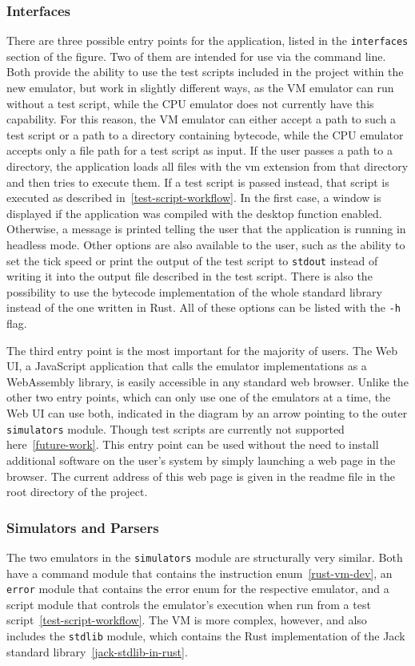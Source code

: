 \subsubsection{Interfaces} \label{interfaces}
There are three possible entry points for the application, listed in the \verb+interfaces+ section of the figure.
Two of them are intended for use via the command line.
Both provide the ability to use the test scripts included in the project within the new emulator, but work in slightly different ways, as the VM emulator can run without a test script, while the CPU emulator does not currently have this capability.
For this reason, the VM emulator can either accept a path to such a test script or a path to a directory containing bytecode, while the CPU emulator accepts only a file path for a test script as input.
If the user passes a path to a directory, the application loads all files with the vm extension from that directory and then tries to execute them.
If a test script is passed instead, that script is executed as described in~\cref{test-script-workflow}.
In the first case, a window is displayed if the application was compiled with the desktop function enabled.
Otherwise, a message is printed telling the user that the application is running in headless mode.
Other options are also available to the user, such as the ability to set the tick speed or print the output of the test script to \verb+stdout+ instead of writing it into the output file described in the test script.
There is also the possibility to use the bytecode implementation of the whole standard library instead of the one written in Rust.
All of these options can be listed with the \verb+-h+ flag.

The third entry point is the most important for the majority of users.
The Web UI, a JavaScript application that calls the emulator implementations as a WebAssembly library, is easily accessible in any standard web browser.
Unlike the other two entry points, which can only use one of the emulators at a time, the Web UI can use both, indicated in the diagram by an arrow pointing to the outer \verb+simulators+ module.
Though test scripts are currently not supported here~\ref{future-work}.
This entry point can be used without the need to install additional software on the user's system by simply launching a web page in the browser.
The current address of this web page is given in the readme file in the root directory of the project.

\subsubsection{Simulators and Parsers}
The two emulators in the \verb+simulators+ module are structurally very similar.
Both have a command module that contains the instruction enum~\ref{rust-vm-dev}, an \verb+error+ module that contains the error enum for the respective emulator, and a script module that controls the emulator's execution when run from a test script~\ref{test-script-workflow}.
The VM is more complex, however, and also includes the \verb+stdlib+ module, which contains the Rust implementation of the Jack standard library~\ref{jack-stdlib-in-rust}.

